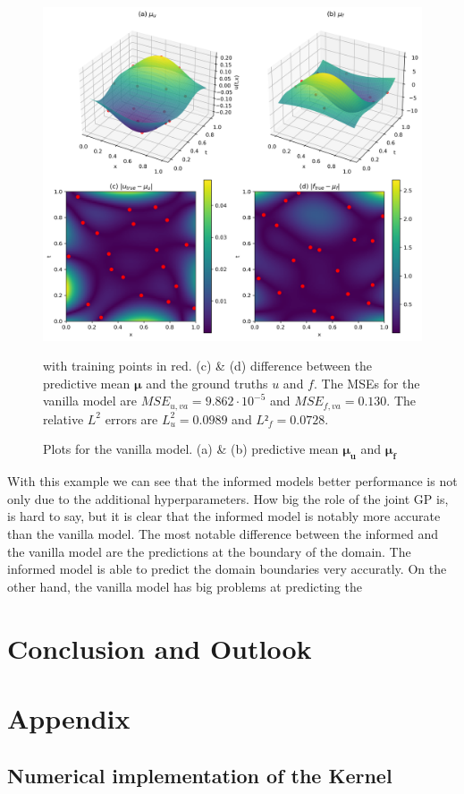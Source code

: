 \documentclass{article}
\begin{document}
\begin{figure}[htbp!]
    \centering
    \includegraphics[width=1\textwidth]{../final_examples/poisson/GPy_mean_diff.png}
    \caption{Plots for the vanilla model. (a) \& (b) predictive mean $\bm{\mu_u}$ and $\bm{\mu_f}$} with training points in red. (c) \& (d) difference between the predictive mean $\bm{\mu}$ and the ground truths $u$ and $f$. The MSEs for the vanilla model are $MSE_{u,va} = 9.862  \cdot 10^{-5}$ and $MSE_{f,va} = 0.130$. The relative $L^2$ errors are $L^2_u = 0.0989$ and $L²_f = 0.0728$.
    ~\label{fig:poisson_GPY}
\end{figure}
With this example we can see that the informed models better performance is not only due to the additional hyperparameters. How big the role of the joint GP is, is hard to say, but it is clear that the informed model is notably more accurate than the vanilla model. The most notable difference between the informed and the vanilla model are the predictions at the boundary of the domain. The informed model is able to predict the domain boundaries very accuratly. On the other hand, the vanilla model has big problems at predicting the \\
\section{Conclusion and Outlook}

\section{Appendix}
\subsection{Numerical implementation of the Kernel}



\end{document}

